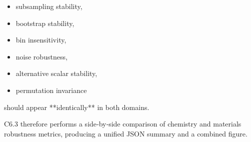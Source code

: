 \documentclass[11pt, letterpaper, openany]{book}
\begin{document}
\begin{itemize}
    \item subsampling stability,
    \item bootstrap stability,
    \item bin insensitivity,
    \item noise robustness,
    \item alternative scalar stability,
    \item permutation invariance
\end{itemize}

should appear **identically** in both domains.

C6.3 therefore performs a side‑by‑side comparison of chemistry and materials
robustness metrics, producing a unified JSON summary and a combined figure.
\end{document}
